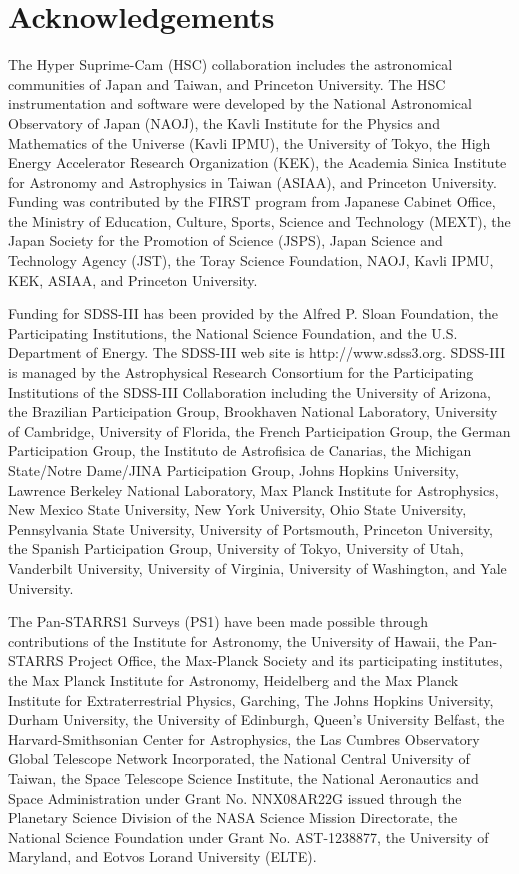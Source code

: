 \documentclass[a4paper,fleqn,usenatbib]{mnras}
\begin{document}
\section*{Acknowledgements}

  The Hyper Suprime-Cam (HSC) collaboration includes the astronomical communities of 
  Japan and Taiwan, and Princeton University.  The HSC instrumentation and software were
  developed by the National Astronomical Observatory of Japan (NAOJ), the Kavli Institute
  for the Physics and Mathematics of the Universe (Kavli IPMU), the University of Tokyo,
  the High Energy Accelerator Research Organization (KEK), the Academia Sinica Institute
  for Astronomy and Astrophysics in Taiwan (ASIAA), and Princeton University.  
  Funding was contributed by the FIRST program from Japanese Cabinet Office, the Ministry 
  of Education, Culture, Sports, Science and Technology (MEXT), the Japan Society for 
  the Promotion of Science (JSPS), Japan Science and Technology Agency (JST), the
  Toray Science Foundation, NAOJ, Kavli IPMU, KEK, ASIAA, and Princeton University.
   
  Funding for SDSS-III has been provided by the Alfred P. Sloan Foundation, the
  Participating Institutions, the National Science Foundation, and the U.S.  Department of
  Energy. The SDSS-III web site is http://www.sdss3.org.  SDSS-III is managed by the
  Astrophysical Research Consortium for the Participating Institutions of the SDSS-III
  Collaboration including the University of Arizona, the Brazilian Participation Group,
  Brookhaven National Laboratory, University of Cambridge, University of Florida, the
  French Participation Group, the German Participation Group, the Instituto de Astrofisica
  de Canarias, the Michigan State/Notre Dame/JINA Participation Group, Johns Hopkins
  University, Lawrence Berkeley National Laboratory, Max Planck Institute for
  Astrophysics, New Mexico State University, New York University, Ohio State University,
  Pennsylvania State University, University of Portsmouth, Princeton University, the
  Spanish Participation Group, University of Tokyo, University of Utah, Vanderbilt
  University, University of Virginia, University of Washington, and Yale University.
  
  The Pan-STARRS1 Surveys (PS1) have been made possible through contributions of the 
  Institute for Astronomy, the University of Hawaii, the Pan-STARRS Project Office, 
  the Max-Planck Society and its participating institutes, the Max Planck Institute 
  for Astronomy, Heidelberg and the Max Planck Institute for Extraterrestrial Physics, 
  Garching, The Johns Hopkins University, Durham University, the University of Edinburgh, 
  Queen's University Belfast, the Harvard-Smithsonian Center for Astrophysics, the Las 
  Cumbres Observatory Global Telescope Network Incorporated, the National Central 
  University of Taiwan, the Space Telescope Science Institute, the National Aeronautics 
  and Space Administration under Grant No. NNX08AR22G issued through the Planetary 
  Science Division of the NASA Science Mission Directorate, the National Science 
  Foundation under Grant No. AST-1238877, the University of Maryland, and Eotvos 
  Lorand University (ELTE).
  
\end{document}
